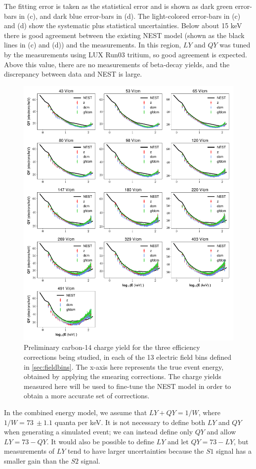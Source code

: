 The fitting error is taken as the statistical error and is shown as dark green error-bars in (c), and dark blue error-bars in (d). The light-colored error-bars in (c) and (d) show the systematic plus statistical uncertainties. Below about 15 keV there is good agreement between the existing NEST model (shown as the black lines in (c) and (d)) and the measurements. In this region, $LY$ and $QY$ was tuned by the measurements using LUX Run03 tritium, so good agreement is expected. Above this value, there are no measurements of beta-decay yields, and the discrepancy between data and NEST is large.


\begin{figure}[h!]
\centering
\includegraphics[width=\textwidth]{Figures/C14_QY_prelim.pdf}
\caption{Preliminary carbon-14 charge yield for the three efficiency corrections being studied, in each of the 13 electric field bins defined in \ref{sec:fieldbins}. The x-axis here represents the true event energy, obtained by applying the smearing corrections. The charge yields measured here will be used to fine-tune the NEST model in order to obtain a more accurate set of corrections.}
\label{fig:C14_QY_prelim}
\end{figure}
In the combined energy model, we assume that $LY+QY=1/W$, where $1/W=73 \ \pm1.1$ quanta per keV. It is not necessary to define both $LY$ and $QY$ when generating a simulated event; we can instead define only $QY$ and allow $LY=73-QY$. It would also be possible to define $LY$ and let $QY=73-LY$, but measurements of $LY$ tend to have larger uncertainties because the $S1$ signal has a smaller gain than the $S2$ signal. 

